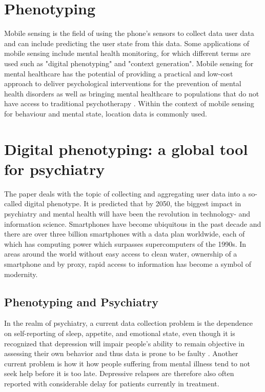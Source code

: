 \section{Phenotyping}

Mobile sensing is the field of using the phone's sensors to collect data user data and can include predicting the user state from this data. Some applications of mobile sensing include mental health monitoring, for which different terms are used such as "digital phenotyping" and "context generation". Mobile sensing for mental healthcare has the potential of providing a practical and low-cost approach to deliver psychological interventions for the prevention of mental health disorders \cite{mobile-based-interventions} as well as bringing mental healthcare to populations that do not have access to traditional psychotherapy \cite{future-mental-health}. Within the context of mobile sensing for behaviour and mental state, location data is commonly used. 

\section{Digital phenotyping: a global tool for psychiatry}
The paper \cite{digital_phenotyping} deals with the topic of collecting and aggregating user data into a so-called digital phenotype. It is predicted that by 2050, the biggest impact in psychiatry and mental health will have been the revolution in technology- and information science. Smartphones have become ubiquitous in the past decade and there are over three billion smartphones with a data plan worldwide, each of which has computing power which surpasses supercomputers of the 1990s. In areas around the world without easy access to clean water, ownership of a smartphone and by proxy, rapid access to information has become a symbol of modernity. 

\subsection{Phenotyping and Psychiatry}
In the realm of psychiatry, a current data collection problem is the dependence on self-reporting of sleep, appetite, and emotional state, even though it is recognized that depression will impair people's ability to remain objective in assessing their own behavior and thus data is prone to be faulty \cite{digital_phenotyping}. Another current problem is how it how people suffering from mental illness tend to not seek help before it is too late. Depressive relapses are therefore also often reported with considerable delay for patients currently in treatment. 


